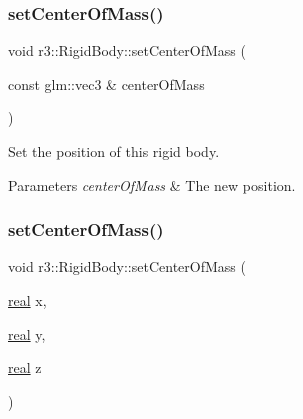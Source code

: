 \mbox{\label{classr3_1_1_rigid_body_a96d0738162ca1fe649bab7174e21afd8}} 
\subsubsection{\texorpdfstring{set\+Center\+Of\+Mass()}{setCenterOfMass()}\hspace{0.1cm}{\footnotesize\ttfamily [1/2]}}
{\footnotesize\ttfamily void r3\+::\+Rigid\+Body\+::set\+Center\+Of\+Mass (\begin{DoxyParamCaption}\item[{const glm\+::vec3 \&}]{center\+Of\+Mass }\end{DoxyParamCaption})}



Set the position of this rigid body. 


\begin{DoxyParams}{Parameters}
{\em center\+Of\+Mass} & The new position. \\
\hline
\end{DoxyParams}
\mbox{\label{classr3_1_1_rigid_body_aed33487eb4fdc0009b40361391cdf6c2}} 
\subsubsection{\texorpdfstring{set\+Center\+Of\+Mass()}{setCenterOfMass()}\hspace{0.1cm}{\footnotesize\ttfamily [2/2]}}
{\footnotesize\ttfamily void r3\+::\+Rigid\+Body\+::set\+Center\+Of\+Mass (\begin{DoxyParamCaption}\item[{\mbox{\hyperlink{namespacer3_ab2016b3e3f743fb735afce242f0dc1eb}{real}}}]{x,  }\item[{\mbox{\hyperlink{namespacer3_ab2016b3e3f743fb735afce242f0dc1eb}{real}}}]{y,  }\item[{\mbox{\hyperlink{namespacer3_ab2016b3e3f743fb735afce242f0dc1eb}{real}}}]{z }\end{DoxyParamCaption})}



